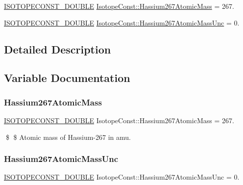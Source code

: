 \begin{DoxyCompactItemize}
\item 
\mbox{\hyperlink{group___isotope_const-_macros_ga8f45a7272ce02c0b4c65c44636ed719a}{I\+S\+O\+T\+O\+P\+E\+C\+O\+N\+S\+T\+\_\+\+D\+O\+U\+B\+LE}} \mbox{\hyperlink{group___isotope_const-_hassium-_hs267_ga9c2e87a6c594b7044149b1f64fc2451b}{Isotope\+Const\+::\+Hassium267\+Atomic\+Mass}} = 267.
\item 
\mbox{\hyperlink{group___isotope_const-_macros_ga8f45a7272ce02c0b4c65c44636ed719a}{I\+S\+O\+T\+O\+P\+E\+C\+O\+N\+S\+T\+\_\+\+D\+O\+U\+B\+LE}} \mbox{\hyperlink{group___isotope_const-_hassium-_hs267_gac0c6bdf48709414975b0305ce64a9e1a}{Isotope\+Const\+::\+Hassium267\+Atomic\+Mass\+Unc}} = 0.
\end{DoxyCompactItemize}


\subsection{Detailed Description}


\subsection{Variable Documentation}
\mbox{\label{group___isotope_const-_hassium-_hs267_ga9c2e87a6c594b7044149b1f64fc2451b}} 
\subsubsection{\texorpdfstring{Hassium267\+Atomic\+Mass}{Hassium267AtomicMass}}
{\footnotesize\ttfamily \mbox{\hyperlink{group___isotope_const-_macros_ga8f45a7272ce02c0b4c65c44636ed719a}{I\+S\+O\+T\+O\+P\+E\+C\+O\+N\+S\+T\+\_\+\+D\+O\+U\+B\+LE}} Isotope\+Const\+::\+Hassium267\+Atomic\+Mass = 267.}

\$ \$ Atomic mass of Hassium-\/267 in amu. \mbox{\label{group___isotope_const-_hassium-_hs267_gac0c6bdf48709414975b0305ce64a9e1a}} 
\subsubsection{\texorpdfstring{Hassium267\+Atomic\+Mass\+Unc}{Hassium267AtomicMassUnc}}
{\footnotesize\ttfamily \mbox{\hyperlink{group___isotope_const-_macros_ga8f45a7272ce02c0b4c65c44636ed719a}{I\+S\+O\+T\+O\+P\+E\+C\+O\+N\+S\+T\+\_\+\+D\+O\+U\+B\+LE}} Isotope\+Const\+::\+Hassium267\+Atomic\+Mass\+Unc = 0.}

